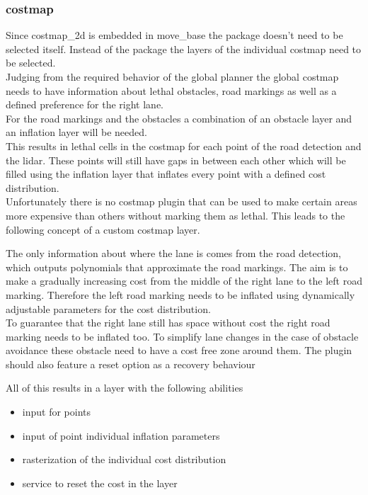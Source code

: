 \subsubsection{costmap}
Since costmap\_2d is embedded in move\_base the package doesn't need to be selected itself. Instead of the package the layers of the individual costmap need to be selected.\\

Judging from the required behavior of the global planner the global costmap needs to have information about lethal obstacles, road markings as well as a defined preference for the right lane.\\

For the road markings and the obstacles a combination of an obstacle layer and an inflation layer will be needed.\\
This results in lethal cells in the costmap for each point of the road detection and the lidar. These points will still have gaps in between each other which will be filled using the inflation layer that inflates every point with a defined cost distribution.\\

Unfortunately there is no costmap plugin that can be used to make certain areas more expensive than others without marking them as lethal. This leads to the following concept of a custom costmap layer.

The only information about where the lane is comes from the road detection, which outputs polynomials that approximate the road markings. The aim is to make a gradually increasing cost from the middle of the right lane to the left road marking. Therefore the left road marking needs to be inflated using dynamically adjustable parameters for the cost distribution.\\
To guarantee that the right lane still has space without cost the right road marking needs to be inflated too. To simplify lane changes in the case of obstacle avoidance these obstacle need to have a cost free zone around them.
The plugin should also feature a reset option as a recovery behaviour

All of this results in a layer with the following abilities

\begin{itemize}
	\item input for points
	\item input of point individual inflation parameters
	\item rasterization of the individual cost distribution
	\item service to reset the cost in the layer
\end{itemize}

